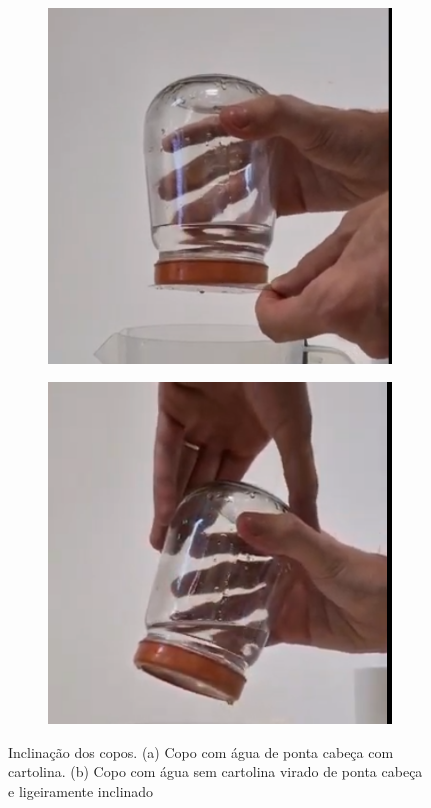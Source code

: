     \begin{figure}[H]
        \centering
        \begin{subfigure}{.45\textwidth}
            \centering
            \includegraphics[width=0.5\linewidth]{fig/copo_cartolina.png}
            \caption{}
            \label{c_c_v.png}
        \end{subfigure}
        \begin{subfigure}{.45\textwidth}
            \centering
            \includegraphics[width=.5\linewidth]{fig/copo_inclinado.png}
            \caption{}
            \label{c_m_i.png}
        \end{subfigure}
        \caption{Inclinação dos copos. (a) Copo com água de ponta cabeça com cartolina. (b) Copo com água sem cartolina virado de ponta cabeça e ligeiramente inclinado }
        \label{duasimage}
    \end{figure}

